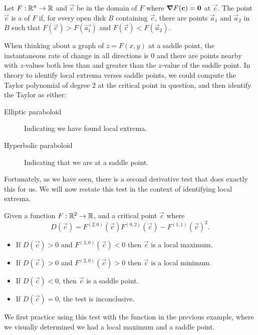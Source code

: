 \documentclass{ximera}
\begin{document}
\begin{definition}
  Let $F:\mathbb R^n\to\mathbb R$ and $\vec{c}$ be in the domain of $F$ where $\boldsymbol\nabla
  F(\mathbf{c})=\mathbf{0}$ at $\vec{c}$. The point $\vec{c}$ is a
   of $F$ if, for every open disk $B$ containing
  $\vec{c}$, there are points $\vec{a}_1$ and $\vec{a}_2$ in $B$ such
  that $F(\vec{c})>F(\vec{a_1})$ and $F(\vec{c})<F(\vec{a}_2)$.
\end{definition}

When thinking about a graph of $z= F(x,y)$ at a saddle point, the
instantaneous rate of change in all directions is $0$ and there are
points nearby with $z$-values both less than and greater than the
$z$-value of the saddle point.  In theory to identify local extrema
verses saddle points, we could compute the Taylor polynomial of degree
$2$ at the critical point in question, and then identify the Taylor as
either:
\begin{description}
\item[Elliptic paraboloid] Indicating we have found local extrema.
\item[Hyperbolic paraboloid] Indicating that we are at a saddle point.
\end{description}
Fortunately, as we have seen, there is a second derivative test that
does exactly this for us. We will now restate this test in the context
of identifying local extrema.

\begin{theorem}
  Given a function $F:\mathbb R^2\to \mathbb R$, and a critical point $\vec{c}$ where
  \[
  D(\vec{c}) = F^{(2,0)}(\vec{c})F^{(0,2)}(\vec{c})-F^{(1,1)}(\vec{c})^2.
  \]
  \begin{itemize}
  \item If $D(\vec{c})>0$ and $F^{(2,0)}(\vec{c})<0$ then $\vec{c}$ is a local maximum.
  \item If $D(\vec{c})>0$ and $F^{(2,0)}(\vec{c})>0$ then $\vec{c}$ is a local minimum.
  \item	If $D(\vec{c})<0$, then $\vec{c}$ is a saddle point.
  \item If $D(\vec{c})=0$, the test is inconclusive.
  \end{itemize}
\end{theorem}

We first practice using this test with the function in the previous
example, where we visually determined we had a local maximum and a
saddle point.
\end{document}
